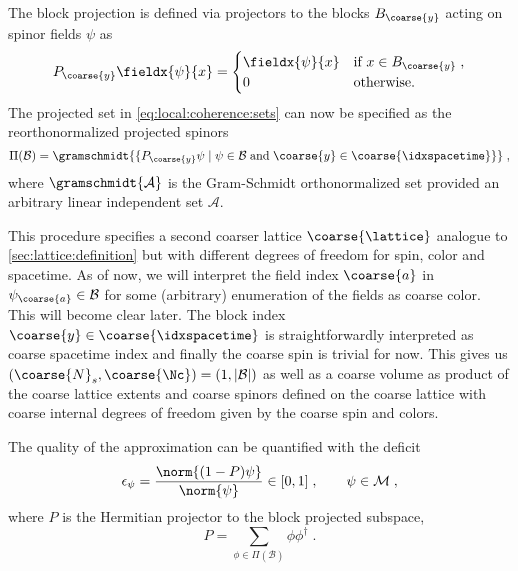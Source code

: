 The block projection is defined via projectors to the blocks $B_{\coarse{y}}$ acting on spinor fields $\psi$ as
\begin{equation}
P_{\coarse{y}} \fieldx{\psi}{x} =
\begin{cases}
\fieldx{\psi}{x} & \text{if } x \in B_{\coarse{y}} \;, \\
0 & \text{otherwise.}
\end{cases}
\end{equation}
The projected set in \cref{eq:local:coherence:sets} can now be specified as the reorthonormalized projected spinors
\begin{equation}
\Pi(\mathcal{B}) = \gramschmidt{ \{ P_{\coarse{y}}\psi \mid \psi \in \mathcal{B} \; \text{and} \; \coarse{y} \in \coarse{\idxspacetime} \} } \;,
\end{equation}
where $\gramschmidt{\mathcal{A}}$ is the Gram-Schmidt orthonormalized set provided an arbitrary linear independent set $\mathcal{A}$.

This procedure specifies a second coarser lattice $\coarse{\lattice}$ analogue to \cref{sec:lattice:definition} but with different degrees of freedom for spin, color and spacetime.
As of now, we will interpret the field index $\coarse{a}$ in $\psi_{\coarse{a}} \in \mathcal{B}$ for some (arbitrary) enumeration of the fields as coarse color.
This will become clear later.
The block index $\coarse{y} \in \coarse{\idxspacetime}$ is straightforwardly interpreted as coarse spacetime index and finally the coarse spin is trivial for now.
This gives us $(\coarse{N}_s, \coarse{\Nc}) = (1, \lvert \mathcal{B} \rvert)$ as well as a coarse volume as product of the coarse lattice extents and coarse spinors defined on the coarse lattice with coarse internal degrees of freedom given by the coarse spin and colors.

The quality of the approximation can be quantified with the deficit
\begin{equation}
\epsilon_{\psi} = \frac{\norm{ (1-P) \psi }}{\norm{\psi}} \in [0,1] \;,
\qquad
\psi \in \mathcal{M} \;,
\end{equation}
where $P$ is the Hermitian projector to the block projected subspace,
\begin{equation} \label{eq:lc:projector}
P = \sum_{\phi \in \Pi(\mathcal{B})} \phi \phi^{\dagger} \;.
\end{equation}

